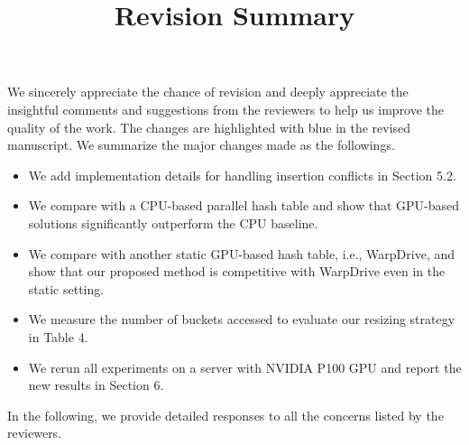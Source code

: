 \documentclass[11pt]{article}
\begin{document}
\title{Revision Summary}
\date{}
\maketitle


\noindent We sincerely appreciate the chance of revision and deeply appreciate the insightful comments and suggestions from the reviewers to help us improve the quality of the work. The changes are highlighted with blue in the revised manuscript. We summarize the major changes made as the followings. 
\begin{itemize}
	\item We add implementation details for handling insertion conflicts in Section 5.2.
	\item We compare with a CPU-based parallel hash table and show that GPU-based solutions significantly outperform the CPU baseline. 
	\item We compare with another static GPU-based hash table, i.e., WarpDrive, and show that our proposed method is competitive with WarpDrive even in the static setting. 
	\item We measure the number of buckets accessed to evaluate our resizing strategy in Table 4.
	\item We rerun all experiments on a server with NVIDIA P100 GPU and report the new results in Section 6.
\end{itemize}
%
In the following, we provide detailed responses to all the concerns listed by the reviewers.







%


\end{document}

